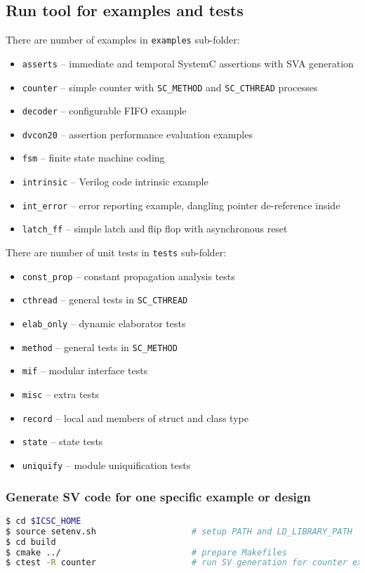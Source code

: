 \subsection{Run tool for examples and tests}

There are number of examples in {\tt examples} sub-folder:
%
\begin{itemize}
\item {\tt asserts}    -- immediate and temporal SystemC assertions with SVA generation
\item {\tt counter}    -- simple counter with {\tt SC\_METHOD} and {\tt SC\_CTHREAD} processes
\item {\tt decoder}    -- configurable FIFO example
\item {\tt dvcon20}    -- assertion performance evaluation examples
\item {\tt fsm}        -- finite state machine coding 
\item {\tt intrinsic}  -- Verilog code intrinsic example
\item {\tt int\_error}  -- error reporting example, dangling pointer de-reference inside
\item {\tt latch\_ff}   -- simple latch and flip flop with asynchronous reset
\end{itemize}

There are number of unit tests in {\tt tests} sub-folder:
%
\begin{itemize}
\item {\tt const\_prop} -- constant propagation analysis tests
\item {\tt cthread}     -- general tests in {\tt SC\_CTHREAD}
\item {\tt elab\_only}  -- dynamic elaborator tests
\item {\tt method}      -- general tests in {\tt SC\_METHOD}
\item {\tt mif}         -- modular interface tests
\item {\tt misc}        -- extra tests
\item {\tt record}      -- local and members of struct and class type
\item {\tt state}       -- state tests
\item {\tt uniquify}    -- module uniquification tests
\end{itemize}

\subsubsection{Generate SV code for one specific example or design}
%
\begin{lstlisting}[language=bash]
$ cd $ICSC_HOME
$ source setenv.sh                   # setup PATH and LD_LIBRARY_PATH
$ cd build   
$ cmake ../                          # prepare Makefiles 
$ ctest -R counter                   # run SV generation for counter example
\end{lstlisting}

